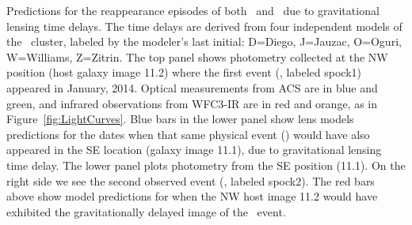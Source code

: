 \label{fig:SpockDelayPredictions}
Predictions for the reappearance episodes of both \spockone\ and \spocktwo\, due to gravitational lensing time delays.  The time delays are derived from four independent models of the \ cluster, labeled by the modeler's last initial: D=Diego, J=Jauzac, O=Oguri, W=Williams, Z=Zitrin.  The top panel shows photometry collected at the NW position (host galaxy image 11.2) where the first event (\spockone, labeled spock1) appeared in January, 2014.  Optical measurements from ACS are in blue and green, and infrared observations from WFC3-IR are in red and orange, as in Figure~\ref{fig:LightCurves}.  Blue bars in the lower panel show lens models predictions for the dates when that same physical event (\spockone) would have also appeared in the SE location (galaxy image 11.1), due to gravitational lensing time delay.  The lower panel plots photometry from the SE position (11.1). On the right side we see the second observed event (\spocktwo, labeled spock2).  The red bars above show model predictions for when the NW host image 11.2 would have exhibited the gravitationally delayed image of the \spocktwo\ event.
  
  